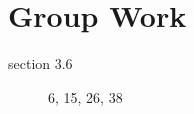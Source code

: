 \documentclass[11pt]{article}
\begin{document}
\section*{Group Work}
\begin{description}
\item[section 3.6] 6, 15, 26, 38
\end{description}
\end{document}
